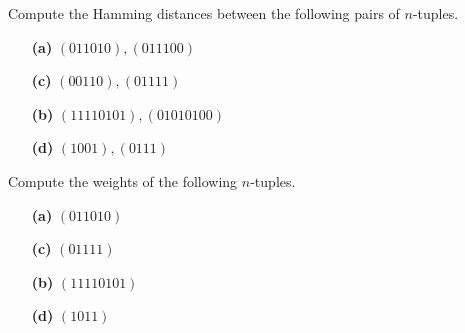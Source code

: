  \begin{exercise}{}
Compute the Hamming distances between the following pairs of
$n$-tuples. 
 
\vspace{3pt}        %
 
\hspace{-7pt}
\begin{minipage}[t]{4.6in}
\noindent
\begin{minipage}[t]{2.25in}
\begin{itemize}
 
 \item[{\bf (a)}]
$(011010), (011100)$
 
 \item[{\bf (c)}]
$(00110), (01111)$
 
 
\end{itemize}
\end{minipage} \hfill
\begin{minipage}[t]{2.25in}
\begin{itemize}
 
 \item[{\bf (b)}]
$(11110101), (01010100)$
 
 \item[{\bf (d)}]
$(1001), (0111)$
 
 
\end{itemize}
\end{minipage}
\end{minipage}
 \end{exercise} 
 
\begin{exercise}{}
Compute the weights of the following $n$-tuples.
 
\vspace{3pt}        %
 
\hspace{-7pt}
\begin{minipage}[t]{4.6in}
\noindent
\begin{minipage}[t]{2.25in}
\begin{itemize}
 
 \item[{\bf (a)}]
$(011010)$
 
 \item[{\bf (c)}]
$(01111)$
 
\end{itemize}
\end{minipage} \hfill
\begin{minipage}[t]{2.25in}
\begin{itemize}
 
 \item[{\bf (b)}]
$(11110101)$
 
 \item[{\bf (d)}]
$(1011)$
 
\end{itemize}
\end{minipage}
\end{minipage}
 
\end{exercise} 

